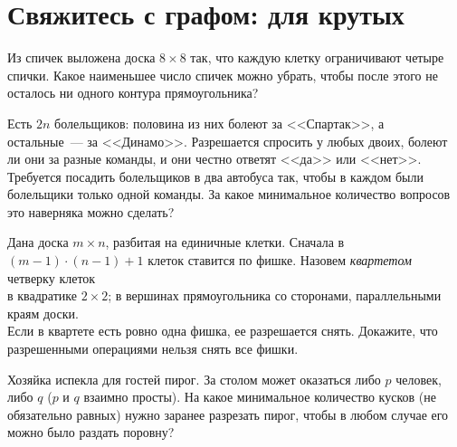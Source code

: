 
\section*{Свяжитесь с графом: для крутых}



\begin{problems}

Из спичек выложена доска $8 \times 8$ так, что каждую клетку ограничивают
четыре спички.
Какое наименьшее число спичек можно убрать, чтобы после этого не осталось
ни одного контура прямоугольника?

Есть $2 n$ болельщиков: половина из них болеют за <<Спартак>>, а остальные~---
за <<Динамо>>.
Разрешается спросить у любых двоих, болеют ли они за разные команды, и они
честно ответят <<да>> или <<нет>>.
Требуется посадить болельщиков в два автобуса так, чтобы в каждом были
болельщики только одной команды.
За какое минимальное количество вопросов это наверняка можно сделать?

Дана доска $m \times n$, разбитая на единичные клетки.
Сначала в $(m - 1) \cdot (n - 1) + 1$ клеток ставится по фишке.
Назовем \emph{квартетом} четверку клеток
\\
\sp в квадратике $2 \times 2$;
\qquad
\sp в вершинах прямоугольника со сторонами, параллельными краям доски.
\\
Если в квартете есть ровно одна фишка, ее разрешается снять.
Докажите, что разрешенными операциями нельзя снять все фишки.

Хозяйка испекла для гостей пирог.
За столом может оказаться либо $p$ человек, либо $q$
($p$ и $q$ взаимно просты).
На какое минимальное количество кусков (не обязательно равных) нужно заранее
разрезать пирог, чтобы в любом случае его можно было раздать поровну?

\end{problems}

